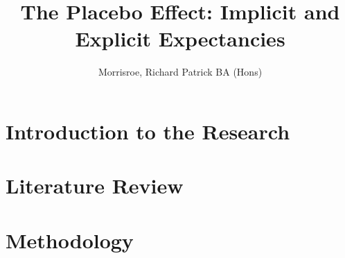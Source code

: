 \documentclass[apsych, phd]{uccthesis}
\title{The Placebo Effect: Implicit and Explicit Expectancies}
\author{Morrisroe, Richard Patrick BA (Hons)}
\begin{document}
\maketitle


\tableofcontents

\chapter{Introduction to the Research}
\label{cha:intr-rese}


\chapter{Literature Review}
\label{cha:literature-review}


\chapter{Methodology}
\label{cha:methodology}
% 


% 



% 
% 

% 

% 
% 


\end{document}
